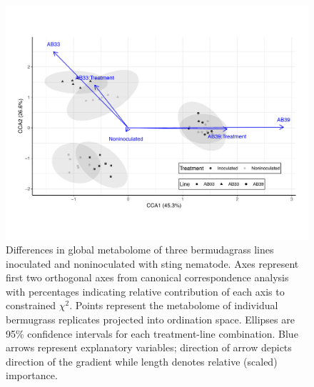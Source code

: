 \documentclass[9pt,lineno]{elife}
\begin{document}
\begin{figure}
\begin{fullwidth}
\includegraphics[width=0.95\linewidth]{figures/publication_figures/figure-2.pdf}
\caption{Differences in global metabolome of three bermudagrass lines inoculated and noninoculated with sting nematode.  Axes represent first two orthogonal axes from canonical correspondence analysis with percentages indicating relative contribution of each axis to constrained $\chi^2$.  Points represent the metabolome of individual bermugrass replicates projected into ordination space.  Ellipses are 95\% confidence intervals for each treatment-line combination.  Blue arrows represent explanatory variables; direction of arrow depicts direction of the gradient while length denotes relative (scaled) importance.  }
\label{fig:figure2}
\end{fullwidth}
\end{figure}
\end{document}
